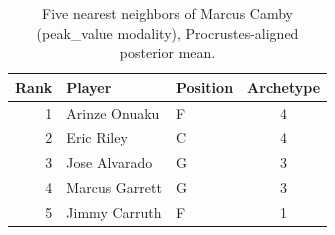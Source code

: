 \begin{table}[htbp]
  \centering\small
  \begin{tabular}{rllc}
    \toprule
    Rank & Player & Position & Archetype \\
    \midrule
    1 & Arinze Onuaku & F & 4 \\
    2 & Eric Riley & C & 4 \\
    3 & Jose Alvarado & G & 3 \\
    4 & Marcus Garrett & G & 3 \\
    5 & Jimmy Carruth & F & 1 \\
    \bottomrule
  \end{tabular}
  \caption{Five nearest neighbors of Marcus Camby (peak_value modality), Procrustes-aligned posterior mean.}
  \label{tab:Marcus_Camby_neighbors_peak_value}
\end{table}

